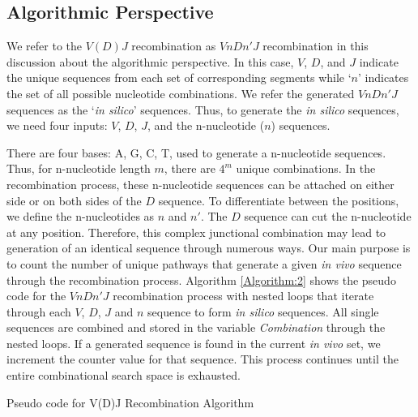 \subsection{Algorithmic Perspective}\label{subsec: algorithm}

We refer to the $V(D)J$ recombination as $VnDn'J$ recombination in this discussion about the algorithmic perspective. In this case, $V$, $D$, and $J$ indicate the unique sequences from each set of corresponding segments while `$n$' indicates the set of all possible nucleotide combinations. We refer the generated $VnDn'J$ sequences as the `\emph{in silico}' sequences. Thus, to generate the \emph{in silico} sequences, we need four inputs: $V$, $D$, $J$, and the n-nucleotide ($n$) sequences.

There are four bases: A, G, C, T, used to generate a n-nucleotide sequences. Thus, for n-nucleotide length $m$, there are $4^m$ unique combinations. In the recombination process, these n-nucleotide sequences can be attached on either side or on both sides of the $D$ sequence. To differentiate between the positions, we define the n-nucleotides as $n$ and $n'$. The $D$ sequence can cut the n-nucleotide at any position. Therefore, this complex junctional combination may lead to generation of an identical sequence through numerous ways. Our main purpose is to count the number of unique pathways that generate a given \emph{in vivo} sequence through the recombination process. Algorithm \ref{Algorithm:2} shows the pseudo code for the $VnDn'J$ recombination process with nested loops that iterate through each $V$, $D$, $J$ and $n$ sequence to form \emph{in silico} sequences. All single sequences are combined and stored in the variable \emph{Combination} through the nested loops. If a generated sequence is found in the current \emph{in vivo} set, we increment the counter value for that sequence. This process continues until the entire combinational search space is exhausted.    

\begin{algorithm}[t]
\nl {}
 \caption{Pseudo code for V(D)J Recombination Algorithm}
\label{Algorithm:2}
\end{algorithm}

